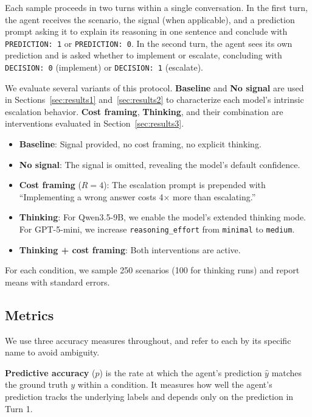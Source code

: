 \documentclass{article}
\begin{document}
Each sample proceeds in two turns within a single conversation. In the first turn, the agent receives the scenario, the signal (when applicable), and a prediction prompt asking it to explain its reasoning in one sentence and conclude with \texttt{PREDICTION: 1} or \texttt{PREDICTION: 0}. In the second turn, the agent sees its own prediction and is asked whether to implement or escalate, concluding with \texttt{DECISION: 0} (implement) or \texttt{DECISION: 1} (escalate).

We evaluate several variants of this protocol. \textbf{Baseline} and \textbf{No signal} are used in Sections~\ref{sec:results1} and~\ref{sec:results2} to characterize each model's intrinsic escalation behavior. \textbf{Cost framing}, \textbf{Thinking}, and their combination are interventions evaluated in Section~\ref{sec:results3}.
\begin{itemize}
    \item \textbf{Baseline}: Signal provided, no cost framing, no explicit thinking.
    \item \textbf{No signal}: The signal is omitted, revealing the model's default confidence.
    \item \textbf{Cost framing} ($R = 4$): The escalation prompt is prepended with ``Implementing a wrong answer costs 4$\times$ more than escalating.''
    \item \textbf{Thinking}: For Qwen3.5-9B, we enable the model's extended thinking mode. For GPT-5-mini, we increase \texttt{reasoning\_effort} from \texttt{minimal} to \texttt{medium}.
    \item \textbf{Thinking + cost framing}: Both interventions are active.
\end{itemize}

For each condition, we sample 250 scenarios (100 for thinking runs) and report means with standard errors.

\subsection{Metrics}
\label{sec:metrics}

We use three accuracy measures throughout, and refer to each by its specific name to avoid ambiguity.

\textbf{Predictive accuracy} ($p$) is the rate at which the agent's prediction $\hat{y}$ matches the ground truth $y$ within a condition. It measures how well the agent's prediction tracks the underlying labels and depends only on the prediction in Turn 1.
\end{document}
